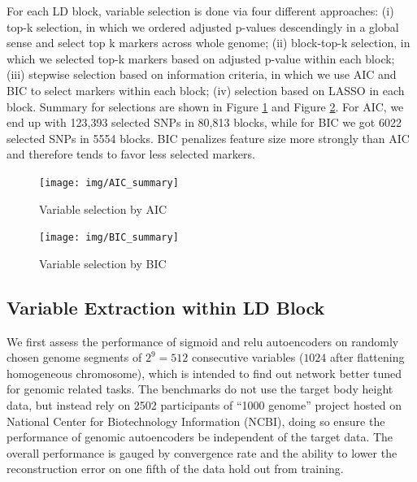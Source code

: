 \documentclass[acmtog, authorversion]{acmart}
\begin{document}
For each LD block, variable selection is done via four different approaches: (i) top-k selection, in which we ordered adjusted p-values descendingly in a global sense and select top k markers across whole genome; (ii) block-top-k selection, in which we selected top-k markers based on adjusted p-value within each block; (iii) stepwise selection based on information criteria, in which we use AIC and BIC to select markers within each block; (iv) selection based on LASSO in each block. Summary for selections are shown in Figure \ref{fig:AIC} and Figure {\ref{fig:BIC}}. For AIC, we end up with 123,393 selected SNPs in 80,813 blocks, while for BIC we got 6022 selected SNPs in 5554 blocks. BIC penalizes feature size more strongly than AIC and therefore tends to favor less selected markers. 

\begin{figure}[!h]
  \centering
  \texttt{[image: img/AIC\_summary]}
  \caption{Variable selection by AIC}
  \label{fig:AIC}
\end{figure}
\begin{figure}[!h]
  \centering
  \texttt{[image: img/BIC\_summary]}
  \caption{Variable selection by BIC}
  \label{fig:BIC}
\end{figure}


\subsection{Variable Extraction within LD Block}
We first assess the performance of sigmoid and relu autoencoders on randomly chosen genome segments of $2^9 = 512$ consecutive variables ($1024$ after flattening homogeneous chromosome), which is intended to find out network better tuned for genomic related tasks. The benchmarks do not use the target body height data, but instead rely on 2502 participants of ``1000 genome'' project hosted on National Center for Biotechnology Information (NCBI), doing so ensure the performance of genomic autoencoders be independent of the target data. The overall performance is gauged by convergence rate and the ability to lower the reconstruction error on one fifth of the data hold out from training.
\end{document}
